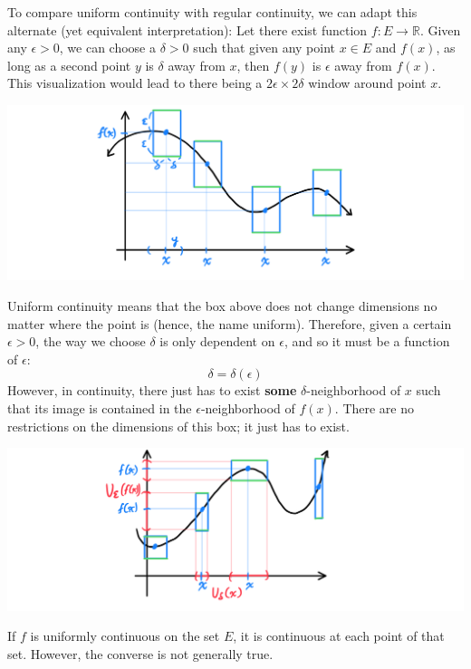   To compare uniform continuity with regular continuity, we can adapt this alternate (yet equivalent interpretation): Let there exist function $f: E \longrightarrow \mathbb{R}$. Given any $\epsilon>0$, we can choose a $\delta>0$ such that given any point $x \in E$ and $f(x)$, as long as a second point $y$ is $\delta$ away from $x$, then $f(y)$ is $\epsilon$ away from $f(x)$. This visualization would lead to there being a $2\epsilon \times 2\delta$ window around point $x$. 
  \begin{center}
      \includegraphics[scale=0.3]{img/Double_Epsilon_Delta_Uniform_Continuity.PNG}
  \end{center}
  Uniform continuity means that the box above does not change dimensions no matter where the point is (hence, the name uniform). Therefore, given a certain $\epsilon > 0$, the way we choose $\delta$ is only dependent on $\epsilon$, and so it must be a function of $\epsilon$: 
  \[\delta = \delta(\epsilon)\]
  However, in continuity, there just has to exist \textbf{some} $\delta$-neighborhood of $x$ such that its image is contained in the $\epsilon$-neighborhood of $f(x)$. There are no restrictions on the dimensions of this box; it just has to exist. 
  \begin{center}
      \includegraphics[scale=0.28]{img/Regular_Continuity_Box_Visual.PNG}
  \end{center}

  \begin{lemma}
    If $f$ is uniformly continuous on the set $E$, it is continuous at each point of that set. However, the converse is not generally true. 
  \end{lemma}

